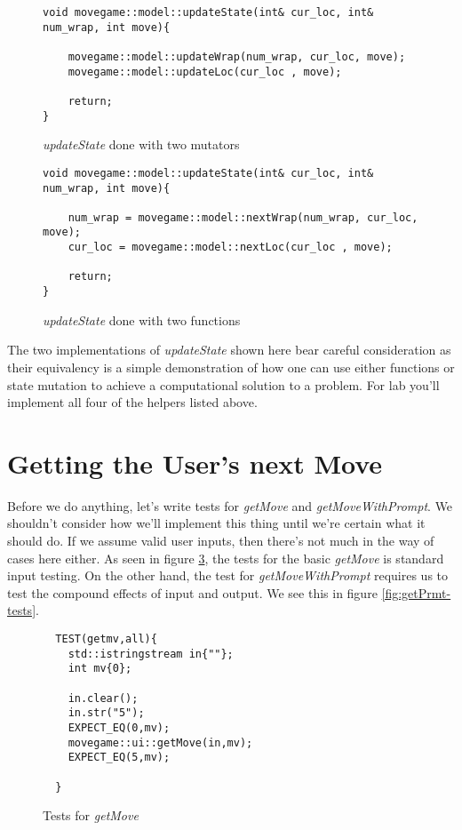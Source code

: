 \documentclass[nobib]{tufte-handout}
\begin{document}
\begin{figure}[!htbp]
\begin{lstlisting}
void movegame::model::updateState(int& cur_loc, int& num_wrap, int move){
	
	movegame::model::updateWrap(num_wrap, cur_loc, move);	
	movegame::model::updateLoc(cur_loc , move);	
	
	return;
}
\end{lstlisting}
\caption{\textit{updateState} done with two mutators}
\label{fig:update-mutate}
\end{figure}


\begin{figure}[!htbp]
\begin{lstlisting}
void movegame::model::updateState(int& cur_loc, int& num_wrap, int move){
	
	num_wrap = movegame::model::nextWrap(num_wrap, cur_loc, move);	
	cur_loc = movegame::model::nextLoc(cur_loc , move);
	
	return;
}
\end{lstlisting}
\caption{\textit{updateState} done with two functions}
\label{fig:update-func}
\end{figure}

The two implementations of \textit{updateState} shown here bear careful consideration as their equivalency is a simple demonstration of how one can use either functions or state mutation to achieve a computational solution to a problem. For lab you'll implement all four of the helpers listed above. 
 
\section{Getting the User's next Move}

Before we do anything, let's write tests for \textit{getMove} and \textit{getMoveWithPrompt}. We shouldn't consider how we'll implement this thing until we're certain what it should do. If we assume valid user inputs, then there's not much in the way of cases here either. As seen in figure \ref{fig:get-tests}, the tests for the basic \textit{getMove} is standard input testing.  On the other hand, the test for \textit{getMoveWithPrompt} requires us to test the compound effects of input and output. We see this in figure \ref{fig:getPrmt-tests}.

\begin{figure}[!htbp]
\begin{lstlisting}
  TEST(getmv,all){
    std::istringstream in{""};
    int mv{0};

    in.clear();
    in.str("5");
    EXPECT_EQ(0,mv);    
    movegame::ui::getMove(in,mv);
    EXPECT_EQ(5,mv);

  }
\end{lstlisting}
\caption{Tests for \textit{getMove}}
\label{fig:get-tests}
\end{figure}
\end{document}
